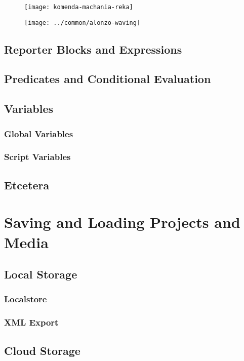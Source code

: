 \documentclass{report}
\begin{document}
\begin{figure}[H]
\begin{minipage}{0.3\textwidth}
\texttt{[image: komenda-machania-reka]}
\end{minipage}%
\begin{minipage}{0.3\textwidth}
\texttt{[image: ../common/alonzo-waving]}
\end{minipage}
\end{figure}

\section{Reporter Blocks and Expressions}
\section{Predicates and Conditional Evaluation}
\section{Variables}
\subsection{Global Variables}
\subsection{Script Variables}
\section{Etcetera}
\chapter{Saving and Loading Projects and Media}
\section{Local Storage}
\subsection{Localstore}
\subsection{XML Export}
\section{Cloud Storage}
\end{document}
